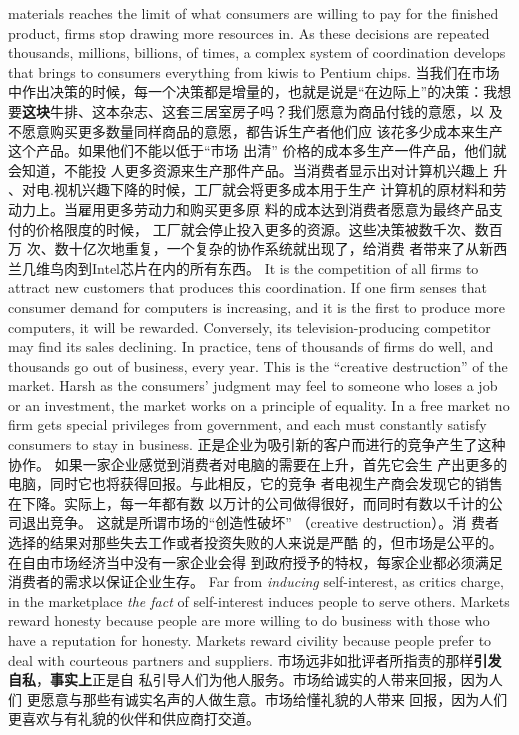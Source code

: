 \begin{paracol}{2}
materials reaches the limit of what consumers are willing to pay
for the finished product, firms stop drawing more resources in.
As these decisions are repeated thousands, millions, billions, of
times, a complex system of coordination develops that brings to
consumers everything from kiwis to Pentium chips.
\switchcolumn
当我们在市场中作出决策的时候，每一个决策都是增量的，也就是说是“在边际上”的决策：我想要\textbf{这块}牛排、这本杂志、这套三居室房子吗？我们愿意为商品付钱的意愿，以
及不愿意购买更多数量同样商品的意愿，都告诉生产者他们应
该花多少成本来生产这个产品。如果他们不能以低于“市场
出清” 价格的成本多生产一件产品，他们就会知道，不能投
人更多资源来生产那件产品。当消费者显示出对计算机兴趣上
升 、对电.视机兴趣下降的时候，工厂就会将更多成本用于生产
计算机的原材料和劳动力上。当雇用更多劳动力和购买更多原
料的成本达到消费者愿意为最终产品支付的价格限度的时候，
工厂就会停止投入更多的资源。这些决策被数千次、数百万
次、数十亿次地重复，一个复杂的协作系统就出现了，给消费
者带来了从新西兰几维鸟肉到Intel芯片在内的所有东西。
\switchcolumn*
It is the competition of all firms to attract new customers
that produces this coordination. If one firm senses that consumer demand for computers is increasing, and it is the first to produce more computers, it will be rewarded. Conversely, its
television-producing competitor may find its sales declining. In
practice, tens of thousands of firms do well, and thousands go
out of business, every year. This is the ``creative destruction'' of
the market. Harsh as the consumers' judgment may feel to
someone who loses a job or an investment, the market works on
a principle of equality. In a free market no firm gets special privileges from government, and each must constantly satisfy consumers to stay in business.
\switchcolumn
正是企业为吸引新的客户而进行的竞争产生了这种协作。
如果一家企业感觉到消费者对电脑的需要在上升，首先它会生
产出更多的电脑，同时它也将获得回报。与此相反，它的竞争
者电视生产商会发现它的销售在下降。实际上，每一年都有数
以万计的公司做得很好，而同时有数以千计的公司退出竞争。
这就是所谓市场的“创造性破坏” （creative  destruction）。消
费者选择的结果对那些失去工作或者投资失败的人来说是严酷
的，但市场是公平的。在自由市场经济当中没有一家企业会得
到政府授予的特权，每家企业都必须满足消费者的需求以保证企业生存。
\switchcolumn*
Far from \textit{inducing} self-interest, as critics charge, in the marketplace \textit{the fact} of self-interest induces people to serve others.
Markets reward honesty because people are more willing to do
business with those who have a reputation for honesty. Markets
reward civility because people prefer to deal with courteous
partners and suppliers.
\switchcolumn
市场远非如批评者所指责的那样\textbf{引发自私}，\textbf{事实上}正是自
私引导人们为他人服务。市场给诚实的人带来回报，因为人们
更愿意与那些有诚实名声的人做生意。市场给懂礼貌的人带来
回报，因为人们更喜欢与有礼貌的伙伴和供应商打交道。


\end{paracol}
